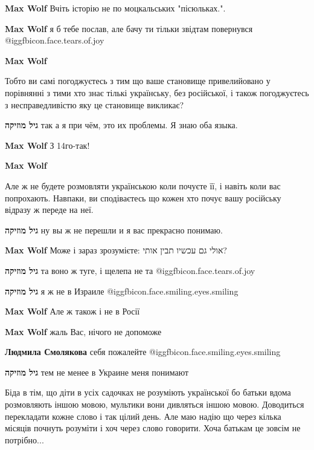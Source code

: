 \begin{itemize}
\begin{itemize}
\textbf{Max Wolf} Вчіть історію не по моцкальських "пісюльках.".

\textbf{Max Wolf} я б тебе послав, але бачу ти тільки звідтам повернувся @igg{fbicon.face.tears.of.joy} 

\textbf{Max Wolf}

Тобто ви самі погоджуєтесь з тим що ваше становище привелийовано у порівнянні з
тими хто знає тількі українську, без російської, і також погоджуєтесь з
несправедливістю яку це становище викликає?

\textbf{גיל מוזיקה} так а я при чём, это их проблемы. Я знаю оба языка.

\textbf{Max Wolf} З 14го-так!

\textbf{Max Wolf}

Але ж не будете розмовляти українською коли почуєте її, і навіть коли вас
попрохають. Навпаки, ви сподіваєтесь що кожен хто почує вашу російську відразу
ж переде на неї.


\textbf{גיל מוזיקה} ну вы ж не перешли и я вас прекрасно понимаю.

\textbf{Max Wolf}
Може і зараз зрозумієте:
אולי גם עכשיו תבין אותי?

\textbf{גיל מוזיקה} та воно ж туге, і щелепа не та @igg{fbicon.face.tears.of.joy} 

\textbf{גיל מוזיקה} я ж не в Израиле @igg{fbicon.face.smiling.eyes.smiling} 

\textbf{Max Wolf}
Але ж також і не в Росії

\textbf{Max Wolf} жаль Вас, нічого не допоможе

\textbf{Людмила Смолякова} себя пожалейте @igg{fbicon.face.smiling.eyes.smiling} 

\textbf{גיל מוזיקה} тем не менее в Украине меня понимают

\end{itemize} %


Біда в тім, що діти в усіх садочках не розуміють української бо батьки вдома
розмовляють іншою мовою, мультики вони дивляться іншою мовою. Доводиться
перекладати кожне слово і так цілий день. Але маю надію що через кілька місяців
почнуть розуміти і хоч через слово говорити. Хоча батькам це зовсім не
потрібно...


\end{itemize}
